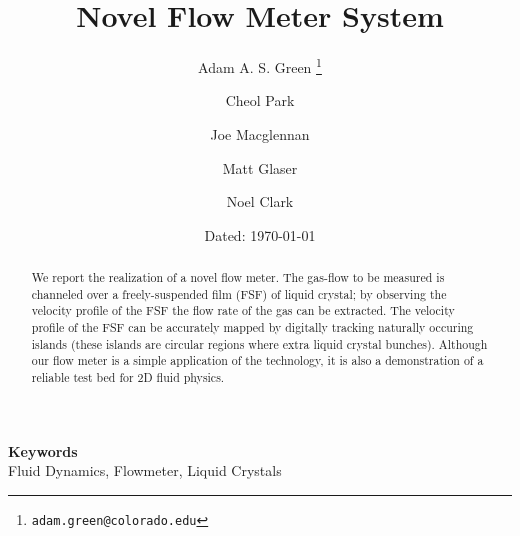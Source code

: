 \documentclass{article} %
\date{} %
\def\keywords#1{\begin{center}{\bf Keywords}\\{#1}\end{center}} %
\begin{document}
\title{Novel Flow Meter System}

\author{Adam A. S. Green%
\thanks{\texttt{adam.green@colorado.edu}}}
\author{Cheol Park}
\author{Joe Macglennan}
\author{Matt Glaser}
\author{Noel Clark}

 
\date{Dated: \today}

\maketitle

\thispagestyle{empty}




\begin{abstract}
\noindent We report the realization of a novel flow meter.
 The gas-flow to be measured is channeled over a freely-suspended
film (FSF) of liquid crystal; by observing the velocity profile of the FSF the
flow rate of the gas can be extracted. The velocity profile of the FSF can be
accurately mapped by digitally tracking naturally occuring islands (these
islands are circular regions where extra liquid crystal bunches). Although our
flow meter is a simple application of the technology, it is also a demonstration
of a reliable test bed for 2D fluid physics.
\end{abstract}

\keywords{Fluid Dynamics, Flowmeter, Liquid Crystals} %




                    
\end{document}

